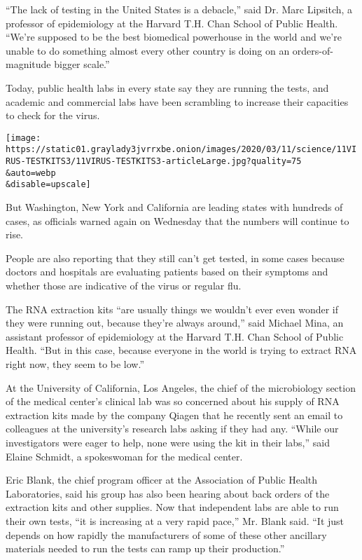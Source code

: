 ``The lack of testing in the United States is a debacle,'' said Dr. Marc
Lipsitch, a professor of epidemiology at the Harvard T.H. Chan School of
Public Health. ``We're supposed to be the best biomedical powerhouse in
the world and we're unable to do something almost every other country is
doing on an orders-of-magnitude bigger scale.''

Today, public health labs in every state say they are running the tests,
and academic and commercial labs have been scrambling to increase their
capacities to check for the virus.

\texttt{[image: https://static01.graylady3jvrrxbe.onion/images/2020/03/11/science/11VIRUS-TESTKITS3/11VIRUS-TESTKITS3-articleLarge.jpg?quality=75\\\&auto=webp\\\&disable=upscale]}

But Washington, New York and California are leading states with hundreds
of cases, as officials warned again on Wednesday that the numbers will
continue to rise.

People are also reporting that they still can't get tested, in some
cases because doctors and hospitals are evaluating patients based on
their symptoms and whether those are indicative of the virus or regular
flu.

The RNA extraction kits ``are usually things we wouldn't ever even
wonder if they were running out, because they're always around,'' said
Michael Mina, an assistant professor of epidemiology at the Harvard T.H.
Chan School of Public Health. ``But in this case, because everyone in
the world is trying to extract RNA right now, they seem to be low.''

At the University of California, Los Angeles, the chief of the
microbiology section of the medical center's clinical lab was so
concerned about his supply of RNA extraction kits made by the company
Qiagen that he recently sent an email to colleagues at the university's
research labs asking if they had any. ``While our investigators were
eager to help, none were using the kit in their labs,'' said Elaine
Schmidt, a spokeswoman for the medical center.

Eric Blank, the chief program officer at the Association of Public
Health Laboratories, said his group has also been hearing about back
orders of the extraction kits and other supplies. Now that independent
labs are able to run their own tests, ``it is increasing at a very rapid
pace,'' Mr. Blank said. ``It just depends on how rapidly the
manufacturers of some of these other ancillary materials needed to run
the tests can ramp up their production.''


